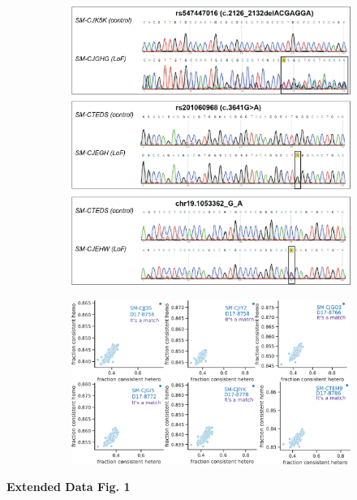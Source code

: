 \begin{figure}[H]
\begin{subfigure}[t]{\textwidth}
    \end{subfigure}  
    \begin{subfigure}[t]{.5\textwidth}
        \caption{}
        \includegraphics[width=\textwidth]{../paper/extended_plots/sanger_seq.png}        
    \end{subfigure}  
    \begin{subfigure}[t]{0.5\textwidth}
        \caption{}
        \includegraphics[width=\textwidth]{../paper/extended_plots/sample_swap.png}        
    \end{subfigure}  
\end{figure}
\textbf{Extended Data Fig. 1}